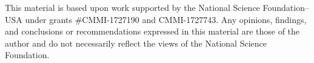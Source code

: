 This material is based upon work supported by the National Science Foundation–USA under grants \#CMMI-1727190 and
CMMI-1727743. Any opinions, findings, and conclusions or recommendations expressed in this material are those of
the author and do not necessarily reflect the views of the National Science Foundation.
